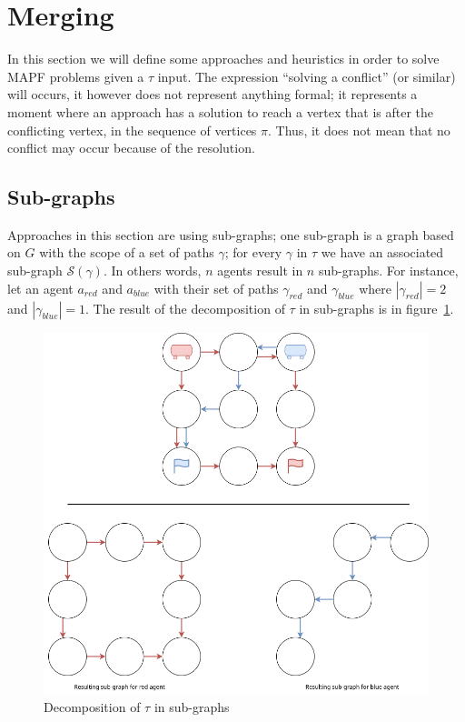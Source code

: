 
\section{Merging}\label{sec:merging}
In this section we will define some approaches and heuristics in order to solve MAPF problems given a \(\tau\) input. The expression ``solving a conflict'' (or similar) will occurs, it however does not represent anything formal; it represents a moment where an approach has a solution to reach a vertex that is after the conflicting vertex, in the sequence of vertices \(\pi\). Thus, it does not mean that no conflict may occur because of the resolution.




\subsection{Sub-graphs}\label{sec:subgraphs}
Approaches in this section are using sub-graphs; one sub-graph is a graph based on \(G\) with the scope of a set of paths \(\gamma\); for every \(\gamma\) in \(\tau\) we have an associated sub-graph \(\mathcal{S}(\gamma)\). In others words, \(n\) agents result in \(n\) sub-graphs. For instance, let an agent \(a_{red}\) and \(a_{blue}\) with their set of paths \(\gamma_{red}\) and \(\gamma_{blue}\) where \(|\gamma_{red}| = 2\) and \(|\gamma_{blue}| = 1\). The result of the decomposition of \(\tau\) in sub-graphs is in figure~\ref{img:from_graph}. 

\begin{figure}[H]
  \centering
  \caption{Decomposition of \(\tau\) in sub-graphs }\label{img:from_graph}
  \includegraphics[width=\widthimg]{img/from_graph_to_subgraph.drawio.png}
\end{figure}

